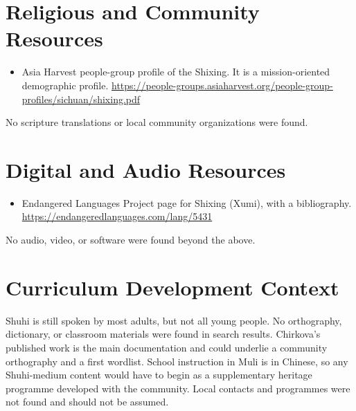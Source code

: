 \documentclass[12pt]{article}
\begin{document}
\section{Religious and Community Resources}
\begin{itemize}
\item Asia Harvest people-group profile of the Shixing. It is a mission-oriented demographic profile. \url{https://people-groups.asiaharvest.org/people-group-profiles/sichuan/shixing.pdf}
\end{itemize}
No scripture translations or local community organizations were found.

\section{Digital and Audio Resources}
\begin{itemize}
\item Endangered Languages Project page for Shixing (Xumi), with a bibliography. \url{https://endangeredlanguages.com/lang/5431}
\end{itemize}
No audio, video, or software were found beyond the above.

\section{Curriculum Development Context}
Shuhi is still spoken by most adults, but not all young people. No orthography, dictionary, or classroom materials were found in search results. Chirkova's published work is the main documentation and could underlie a community orthography and a first wordlist. School instruction in Muli is in Chinese, so any Shuhi-medium content would have to begin as a supplementary heritage programme developed with the community. Local contacts and programmes were not found and should not be assumed.
\end{document}
